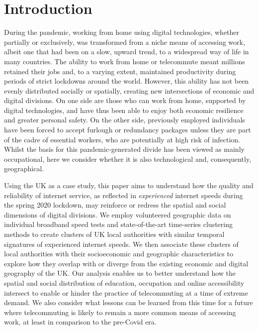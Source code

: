 \documentclass[Royal,times,sageh]{sagej}
\begin{document}
\hypertarget{sec:1}{%
\section{Introduction}\label{sec:1}}

During the pandemic, working from home using digital technologies,
whether partially or exclusively, was transformed from a niche means of
accessing work, albeit one that had been on a slow, upward trend, to a
widespread way of life in many countries. The ability to work from home
or telecommute meant millions retained their jobs and, to a varying
extent, maintained productivity during periods of strict lockdowns
around the world. However, this ability has not been evenly distributed
socially or spatially, creating new intersections of economic and
digital divisions. On one side are those who can work from home,
supported by digital technologies, and have thus been able to enjoy both
economic resilience and greater personal safety. On the other side,
previously employed individuals have been forced to accept furlough or
redundancy packages unless they are part of the cadre of essential
workers, who are potentially at high risk of infection. Whilst the basis
for this pandemic-generated divide has been viewed as mainly
occupational, here we consider whether it is also technological and,
consequently, geographical.

Using the UK as a case study, this paper aims to understand how the
quality and reliability of internet service, as reflected in
\emph{experienced} internet speeds during the spring 2020 lockdown, may
reinforce or redress the spatial and social dimensions of digital
divisions. We employ volunteered geographic data on individual broadband
speed tests and state-of-the-art time-series clustering methods to
create clusters of UK local authorities with similar temporal signatures
of experienced internet speeds. We then associate these clusters of
local authorities with their socioeconomic and geographic
characteristics to explore how they overlap with or diverge from the
existing economic and digital geography of the UK. Our analysis enables
us to better understand how the spatial and social distribution of
education, occupation and online accessibility intersect to enable or
hinder the practice of telecommuting at a time of extreme demand. We
also consider what lessons can be learned from this time for a future
where telecommuting is likely to remain a more common means of accessing
work, at least in comparison to the pre-Covid era.
\end{document}
